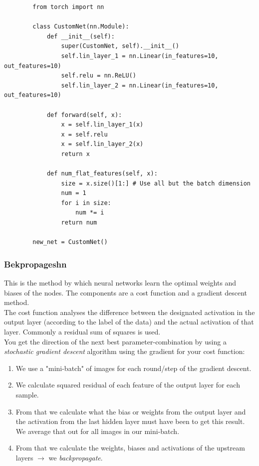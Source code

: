 \documentclass[../main.tex]{subfiles}
\begin{document}
\begin{tcolorbox}[title=Implementation of Feedforward Neural Nets]
    \begin{lstlisting}
        from torch import nn

        class CustomNet(nn.Module):
            def __init__(self):
                super(CustomNet, self).__init__()
                self.lin_layer_1 = nn.Linear(in_features=10, out_features=10)
                self.relu = nn.ReLU()
                self.lin_layer_2 = nn.Linear(in_features=10, out_features=10)
        
            def forward(self, x):
                x = self.lin_layer_1(x)
                x = self.relu
                x = self.lin_layer_2(x)
                return x
        
            def num_flat_features(self, x):
                size = x.size()[1:] # Use all but the batch dimension
                num = 1
                for i in size:
                    num *= i
                return num 
        
        new_net = CustomNet()
        \end{lstlisting}
\end{tcolorbox}

\subsubsection{Bekpropageshn} 
This is the method by which neural networks learn the optimal weights and biases of the nodes. The components are a cost function and a gradient descent method. \\
The cost function analyses the difference between the designated activation in the output layer (according to the label of the data) and the actual activation of that layer. Commonly a residual sum of squares is used. \\ You get the direction of the next best parameter-combination by using a \textit{stochastic gradient descent} algorithm using the gradient for your cost function:
        \begin{enumerate}
            \item We use a "mini-batch" of images for each round/step of the gradient descent. 
            \item We calculate squared residual of each feature of the output layer for each sample.
            \item From that we calculate what the bias or weights from the output layer and the activation from the last hidden layer must have been to get this result. We average that out for all images in our mini-batch.
            \item From that we calculate the weights, biases and activations of the upstream layers $\rightarrow$ we \textit{backpropagate}.
        \end{enumerate}
\end{document}
